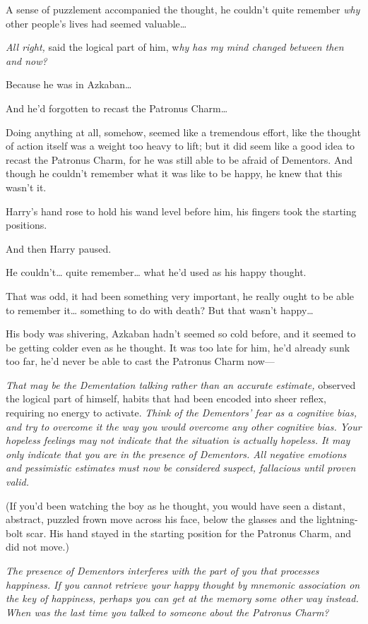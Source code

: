 A sense of puzzlement accompanied the thought, he couldn't quite remember 
\emph{why} other people's lives had seemed valuable{\ldots}

\emph{All right,} said the logical part of him, w\emph{hy has my mind changed 
between then and now?}

Because he was in Azkaban{\ldots}

And he'd forgotten to recast the Patronus Charm{\ldots}

Doing anything at all, somehow, seemed like a tremendous effort, like the 
thought of action itself was a weight too heavy to lift; but it did seem like a 
good idea to recast the Patronus Charm, for he was still able to be afraid of 
Dementors. And though he couldn't remember what it was like to be happy, he 
knew that this wasn't it.

Harry's hand rose to hold his wand level before him, his fingers took the 
starting positions.

And then Harry paused.

He couldn't{\ldots} quite remember{\ldots} what he'd used as his happy thought.

That was odd, it had been something very important, he really ought to be able 
to remember it{\ldots} something to do with death? But that wasn't happy{\ldots}

His body was shivering, Azkaban hadn't seemed so cold before, and it seemed to 
be getting colder even as he thought. It was too late for him, he'd already 
sunk too far, he'd never be able to cast the Patronus Charm now---

\emph{That may be the Dementation talking rather than an accurate estimate,} 
observed the logical part of himself, habits that had been encoded into sheer 
reflex, requiring no energy to activate. \emph{Think of the Dementors' fear as 
a cognitive bias, and try to overcome it the way you would overcome any other 
cognitive bias. Your hopeless feelings may not indicate that the situation is 
actually hopeless. It may only indicate that you are in the presence of 
Dementors. All negative emotions and pessimistic estimates must now be 
considered suspect, fallacious until proven valid.}

(If you'd been watching the boy as he thought, you would have seen a distant, 
abstract, puzzled frown move across his face, below the glasses and the 
lightning-bolt scar. His hand stayed in the starting position for the Patronus 
Charm, and did not move.)

\emph{The presence of Dementors interferes with the part of you that processes 
happiness. If you cannot retrieve your happy thought by mnemonic association on 
the key of happiness, perhaps you can get at the memory some other way instead. 
When was the last time you talked to someone about the Patronus Charm?}

